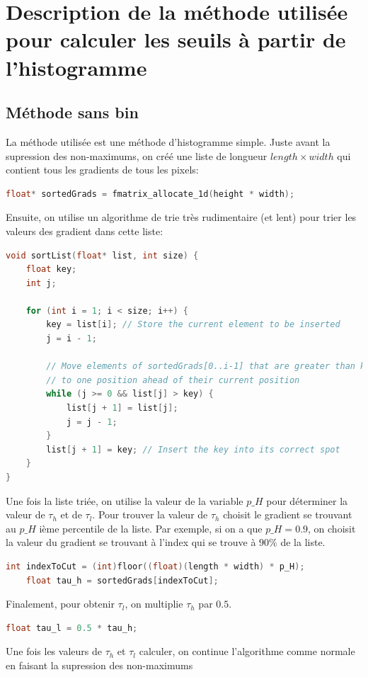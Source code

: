 \documentclass{article}
\begin{document}
\section*{Description de la méthode utilisée pour calculer les seuils à partir de l'histogramme}
\subsection*{Méthode sans \textbf{bin}}
La méthode utilisée est une méthode d'histogramme simple. Juste avant la supression des non-maximums, on créé une liste de longueur $length \times width$ qui contient tous
les gradients de tous les pixels:
\begin{lstlisting}[language=c]
    float* sortedGrads = fmatrix_allocate_1d(height * width);
\end{lstlisting}
Ensuite, on utilise un algorithme de trie très rudimentaire (et lent) pour trier les valeurs des gradient dans cette liste:
\begin{lstlisting}[language=C]
void sortList(float* list, int size) {
    float key;
    int j;

    for (int i = 1; i < size; i++) {
        key = list[i]; // Store the current element to be inserted
        j = i - 1;

        // Move elements of sortedGrads[0..i-1] that are greater than key
        // to one position ahead of their current position
        while (j >= 0 && list[j] > key) {
            list[j + 1] = list[j];
            j = j - 1;
        }
        list[j + 1] = key; // Insert the key into its correct spot
    }
}
\end{lstlisting}
Une fois la liste triée, on utilise la valeur de la variable $p\_H$ pour déterminer la valeur de $\tau_h$ et de $\tau_l$. Pour trouver la valeur de $\tau_h$ 
choisit le gradient se trouvant au $p\_H$ ième percentile de la liste. Par exemple, si on a que $p\_H = 0.9$, on choisit la valeur du gradient se trouvant à 
l'index qui se trouve à $90\%$ de la liste.
\begin{lstlisting}[language=C]
    int indexToCut = (int)floor((float)(length * width) * p_H);
    float tau_h = sortedGrads[indexToCut];
\end{lstlisting}
Finalement, pour obtenir $\tau_l$, on multiplie $\tau_h$ par $0.5$.
\begin{lstlisting}[language=C]
    float tau_l = 0.5 * tau_h;
\end{lstlisting}
Une fois les valeurs de $\tau_h$ et $\tau_l$ calculer, on continue l'algorithme comme normale en faisant la supression des non-maximums
\end{document}
